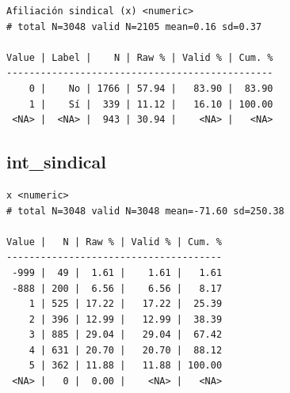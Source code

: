 \documentclass[
  letterpaper,
  DIV=11,
  numbers=noendperiod]{scrreprt}
\newenvironment{Shaded}{\begin{snugshade}}{\end{snugshade}}
\newcommand{\FunctionTok}[1]{\textcolor[rgb]{0.28,0.35,0.67}{#1}}
\newcommand{\NormalTok}[1]{\textcolor[rgb]{0.00,0.23,0.31}{#1}}
\newcommand{\SpecialCharTok}[1]{\textcolor[rgb]{0.37,0.37,0.37}{#1}}
\begin{document}
\begin{verbatim}
Afiliación sindical (x) <numeric> 
# total N=3048 valid N=2105 mean=0.16 sd=0.37

Value | Label |    N | Raw % | Valid % | Cum. %
-----------------------------------------------
    0 |    No | 1766 | 57.94 |   83.90 |  83.90
    1 |    Sí |  339 | 11.12 |   16.10 | 100.00
 <NA> |  <NA> |  943 | 30.94 |    <NA> |   <NA>
\end{verbatim}

\hypertarget{int_sindical}{%
\subsection{int\_sindical}\label{int_sindical}}

\begin{Shaded}
\end{Shaded}

\begin{verbatim}
x <numeric> 
# total N=3048 valid N=3048 mean=-71.60 sd=250.38

Value |   N | Raw % | Valid % | Cum. %
--------------------------------------
 -999 |  49 |  1.61 |    1.61 |   1.61
 -888 | 200 |  6.56 |    6.56 |   8.17
    1 | 525 | 17.22 |   17.22 |  25.39
    2 | 396 | 12.99 |   12.99 |  38.39
    3 | 885 | 29.04 |   29.04 |  67.42
    4 | 631 | 20.70 |   20.70 |  88.12
    5 | 362 | 11.88 |   11.88 | 100.00
 <NA> |   0 |  0.00 |    <NA> |   <NA>
\end{verbatim}
\end{document}

